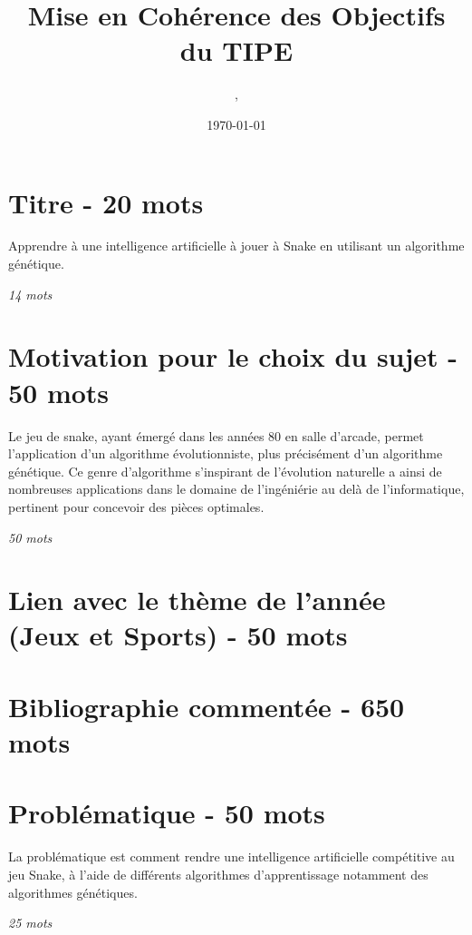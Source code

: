 \documentclass[11pt,a4paper]{article}
\author{\monNom, \maClasse}
\title{Mise en Cohérence des Objectifs du TIPE}
\date{\today}
\makeatletter
\renewcommand{\maketitle}{
  \thispagestyle{empty}
  \begin{center}
  \shadowbox{\parbox{5in}{%
     \centering%
     \textrm{\textbf{\Large \@title}}\\
     \vspace{0.2cm}
     \textrm{\large \@author}\\
     \vspace{0.2cm}
     \textrm{\large \@date}
  }} 
  \end{center}
  \null
}
\makeatother
\begin{document}
\maketitle

\tableofcontents

\thispagestyle{fancy}

\section{Titre - 20 mots}

\begin{center}
    Apprendre à une intelligence artificielle à jouer à Snake en utilisant un algorithme génétique.
\end{center}

\textit{14 mots}

\section{Motivation pour le choix du sujet - 50 mots}

Le jeu de snake, ayant émergé dans les années 80 en salle d'arcade,
permet l'application d'un algorithme évolutionniste, 
plus précisément d'un algorithme génétique.
Ce genre d'algorithme s'inspirant de l'évolution naturelle a ainsi de 
nombreuses applications dans le domaine de l'ingéniérie au delà de l'informatique, 
pertinent pour concevoir des pièces optimales.

\textit{50 mots}

\section{Lien avec le thème de l'année (Jeux et Sports) - 50 mots}

\section{Bibliographie commentée - 650 mots}

\section{Problématique - 50 mots}

La problématique est comment rendre une intelligence artificielle compétitive au jeu Snake, à l'aide de différents algorithmes d'apprentissage notamment des algorithmes génétiques.

\textit{25 mots}
\end{document}
